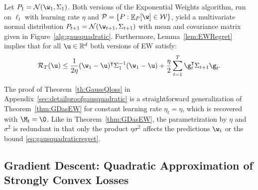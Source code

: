 \documentclass{colt2018} %
\DeclareMathOperator*{\E}{\mathbb{E}}
\renewcommand{\top}{\intercal}
\newcommand{\reals}{\mathbb{R}}
\newcommand{\domainP}{\mathcal{P}}
\newcommand{\domainw}{\mathcal{W}}
\newcommand{\normal}{\mathcal{N}}       %
\newcommand{\sloss}{\ell}                       %
\newcommand{\regret}{\mathcal{R}}
\begin{document}
% 
\begin{theorem}\label{th:GaussQloss}
Let $P_1 = \normal(\w_1, \Sigma_1)$. Both versions of the Exponential
Weights algorithm, run on $\sloss_t$ with learning rate $\eta$ and $\domainP = \{P : \E_P[\w] \in \domainw\}$, yield a multivariate normal distribution $P_{t+1}
= \normal(\w_{t+1}, \Sigma_{t+1})$ with mean and covariance matrix given in
Figure~\ref{alg:gausquadratic}.
Furthermore, Lemma~\ref{lem:EWRegret} implies that for all $\u \in \reals^d$ both versions of EW satisfy:
% 
\begin{equation}\label{eq:gausquadraticregret}
   \regret_T(\u) \leq \frac{1}{2\eta} (\w_1 - \u)^\top \Sigma_1^{-1}(\w_1 - \u) + \frac{\eta}{2}\sum_{t=1}^T\g_t^\top\Sigma_{t+1}\g_t.
\end{equation}
\end{theorem}
% 
The proof of Theorem~\ref{th:GaussQloss} in
Appendix~\ref{sec:detailproofgausquadratic} is a straightforward
generalization of Theorem~\ref{thm:GDasEW} for constant
learning rate $\eta_t = \eta$, which is recovered with
$\M_t = \0$. Like in Theorem~\ref{thm:GDasEW}, the
parametrization by $\eta$ and $\sigma^2$ is redundant in that only the
product $\eta\sigma^2$ affects the predictions $\w_t$ or the bound
\eqref{eq:gausquadraticregret}.
% 
% 
% 
% 
% 
% 
% 
% 
% 
% 
% 
% 
% 
% 
% 
% 
% 
% 
% 
% 
% 
% 
% 
% 
% 
% 
% 
% 
% 
% 

% 
% 
% 
% 
% 
% 
% 
% 

% 
% 
% 
% 
% 

% 
% 
% 
% 
% 
% 
% 
% 
% 
% 
% 
% 
% 
% 
% 
% 
% 
% 
% 
% 
% 
% 
% 
% 
% 
% 
% 
% 
% 
% 
% 
% 

% 




% 
% 
% 
% 
% 
% 
% 
% 
% 
% 
% 
% 
% 
% 
% 
% 
% 
% 
% 
% 


\subsection{Gradient Descent: Quadratic Approximation of Strongly Convex Losses}
\label{sec:stronglyconvex}
\end{document}
